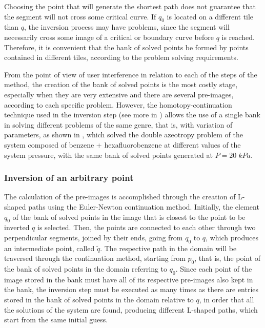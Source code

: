 \documentclass[journal=iecred,manuscript=article]{achemso}
\theoremstyle{definition}
\theoremstyle{remark}
\begin{document}
Choosing the point that will generate the shortest path does not guarantee that the segment will not cross some critical curve. If $ q_{0} $ is located on a different tile than $ q $, the inversion process may have problems, since the segment will necessarily cross some image of a critical or boundary curve before $ q $ is reached. Therefore, it is convenient that the bank of solved points be formed by points contained in different tiles, according to the problem solving requirements.

From the point of view of user interference in relation to each of the steps of the method, the creation of the bank of solved points is the most costly stage, especially when they are very extensive and there are several pre-images, according to each specific problem. However, the homotopy-continuation technique used in the inversion step (see more in \citet{allgower}) allows the use of a single bank in solving different problems of the same genre, that is, with variation of parameters, as shown in \citet{canadian}, which solved the double azeotropy problem of the system composed of benzene + hexafluorobenzene at different values of the system pressure, with the same bank of solved points generated at $ P = 20 \; kPa $.
 
\subsubsection{Inversion of an arbitrary point}

The calculation of the pre-images is accomplished through the creation of L-shaped paths using the Euler-Newton continuation method. Initially, the element $ q_{0} $ of the bank of solved points in the image that is closest to the point to be inverted $ q $ is selected. Then, the points are connected to each other through two perpendicular segments, joined by their ends, going from $ q_{0} $ to $ q $, which produces an intermediate point, called $ \tilde{q} $. The respective path in the domain will be traversed through the continuation method, starting from $ p_{0} $, that is, the point of the bank of solved points in the domain referring to $ q_{0} $. Since each point of the image stored in the bank must have all of its respective pre-images also kept in the bank, the inversion step must be executed as many times as there are entries stored in the bank of solved points in the domain relative to $ q $, in order that all the solutions of the system are found, producing different L-shaped paths, which start from the same initial guess.
\end{document}
